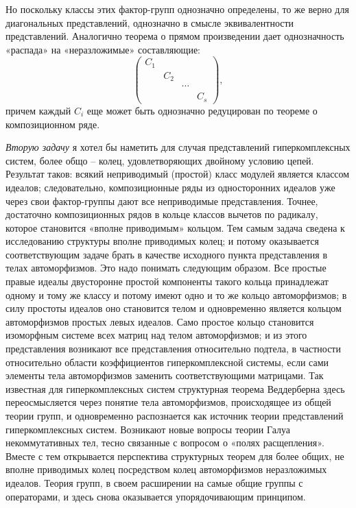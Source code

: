 \documentclass[11pt]{article}
\begin{document}
Но поскольку классы этих фактор-групп однозначно определены, то же верно для диагональных представлений, однозначно в смысле эквивалентности представлений. Аналогично теорема о прямом произведении дает однозначность «распада» на «неразложимые» составляющие:
\[
\begin{pmatrix}
C_1&&&\\
&C_2&&\\
&&\cdots&\\
&&&C_s
\end{pmatrix},
\]
причем каждый $C_i$ еще может быть однозначно редуцирован по теореме о композиционном ряде.

\emph{Вторую задачу} я хотел бы наметить для случая представлений гиперкомплексных систем, более общо -- колец, удовлетворяющих двойному условию цепей. Результат таков: всякий неприводимый (простой) класс модулей является классом идеалов; следовательно, композиционные ряды из односторонних идеалов уже через свои фактор-группы дают все неприводимые представления. Точнее, достаточно композиционных рядов в кольце классов вычетов по радикалу, которое становится «вполне приводимым» кольцом. Тем самым задача сведена к исследованию структуры вполне приводимых колец; и потому оказывается соответствующим задаче брать в качестве исходного пункта представления в телах автоморфизмов. Это надо понимать следующим образом. Все простые правые идеалы двусторонне простой компоненты такого кольца принадлежат одному и тому же классу и потому имеют одно и то же кольцо автоморфизмов; в силу простоты идеалов оно становится телом и одновременно является кольцом автоморфизмов простых левых идеалов. Само простое кольцо становится изоморфным системе всех матриц над телом автоморфизмов; и из этого представления возникают все представления относительно подтела, в частности относительно области коэффициентов гиперкомплексной системы, если сами элементы тела автоморфизмов заменить соответствующими матрицами. Так известная для гиперкомплексных систем структурная теорема Веддерберна здесь переосмысляется через понятие тела автоморфизмов, происходящее из общей теории групп, и одновременно распознается как источник теории представлений гиперкомплексных систем. Возникают новые вопросы теории Галуа некоммутативных тел, тесно связанные с вопросом о «полях расщепления». Вместе с тем открывается перспектива структурных теорем для более общих, не вполне приводимых колец посредством колец автоморфизмов неразложимых идеалов. Теория групп, в своем расширении на самые общие группы с операторами, и здесь снова оказывается упорядочивающим принципом.
\end{document}
